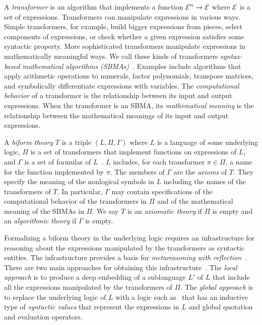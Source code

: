 \documentclass[fleqn]{llncs}
\begin{document}
A \emph{transformer} is an algorithm that implements a function $\mbox{$\cal E$}^n
\rightarrow \mbox{$\cal E$}$ where $\mbox{$\cal E$}$ is a set of expressions.  Transformers can
manipulate expressions in various ways.  Simple transformers, for
example, build bigger expressions from pieces, select components of
expressions, or check whether a given expression satisfies some
syntactic property.  More sophisticated transformers manipulate
expressions in mathematically meaningful ways.  We call these kinds of
transformers \emph{syntax-based mathematical algorithms
  (SBMAs)}~\cite{Farmer13}.  Examples include algorithms that apply
arithmetic operations to numerals, factor polynomials, transpose
matrices, and symbolically differentiate expressions with variables.
The \emph{computational behavior} of a transformer is the relationship
between its input and output expressions.  When the transformer is an
SBMA, its \emph{mathematical meaning} is the relationship between the
mathematical meanings of its input and output expressions.

A \emph{biform theory} $T$ is a triple $(L,\Pi,\Gamma)$ where $L$ is a
language of some underlying logic, $\Pi$ is a set of transformers that
implement functions on expressions of $L$, and $\Gamma$ is a set of
formulas of
$L$~\cite{CaretteFarmer08,Farmer07b,FarmerMohrenschildt03}.  $L$
includes, for each transformer $\pi \in \Pi$, a name for the function
implemented by $\pi$.  The members of $\Gamma$ are the \emph{axioms}
of $T$.  They specify the meaning of the nonlogical symbols in $L$
including the names of the transformers of $T$.  In particular,
$\Gamma$ may contain specifications of the computational behavior of
the transformers in $\Pi$ and of the mathematical meaning of the SBMAs
in $\Pi$.  We say $T$ is an \emph{axiomatic theory} if $\Pi$ is empty
and an \emph{algorithmic theory} if $\Gamma$ is empty.

Formalizing a biform theory in the underlying logic requires an
infrastructure for reasoning about the expressions manipulated by the
transformers as syntactic entities.  The infrastructure provides a
basis for \emph{metareasoning with reflection}~\cite{FarmerArxiv16}.
There are two main approaches for obtaining this
infrastructure~\cite{Farmer13}.  The \emph{local approach} is to
produce a deep embedding of a sublanguage $L'$ of $L$ that include all
the expressions manipulated by the transformers of $\Pi$.  The
\emph{global approach} is to replace the underlying logic of $L$ with
a logic such as~\cite{FarmerArxiv16} that has an inductive
type of \emph{syntactic values} that represent the expressions in $L$
and global quotation and evaluation operators.
\end{document}
